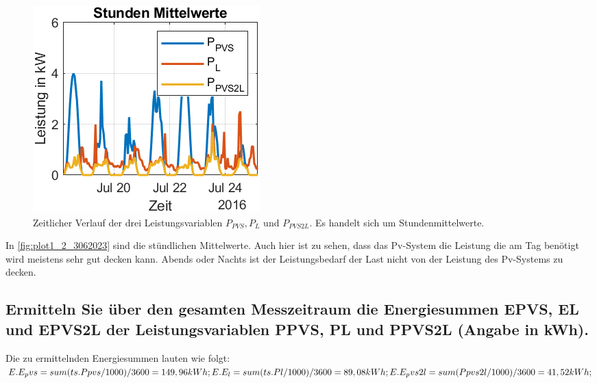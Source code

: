 \begin{figure}[H]
    \centering
    \includegraphics[width=\textwidth]{Abbildungen/aufgabe1_plot2.png}
    \caption{Zeitlicher Verlauf der drei Leistungsvariablen $P_{PVS}, P_{L}$ und $P_{PVS2L}$. Es handelt sich um Stundenmittelwerte.}
    \label{fig:plot1_2_3062023}
\end{figure}
In \autoref{fig:plot1_2_3062023} sind die stündlichen Mittelwerte. Auch hier ist zu sehen, dass das Pv-System die Leistung die am Tag benötigt wird meistens sehr gut decken kann. Abends oder Nachts ist der Leistungsbedarf der Last nicht von der Leistung des Pv-Systems zu decken.
\subsection{Ermitteln Sie über den gesamten Messzeitraum die Energiesummen EPVS, EL und EPVS2L der
Leistungsvariablen PPVS, PL und PPVS2L (Angabe in kWh).}
Die zu ermittelnden Energiesummen lauten wie folgt:
\\


$E.E_pvs = sum(ts.Ppvs/1000)/3600=149,96kWh;\\
E.E_l = sum(ts.Pl/1000)/3600=89,08kWh;\\
E.E_pvs2l = sum(Ppvs2l/1000)/3600=41,52kWh;$\\

